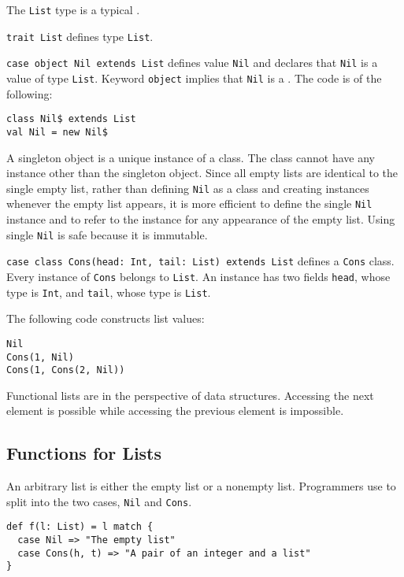 The \verb!List! type is a typical .

\verb!trait List! defines type \verb!List!.

\verb!case object Nil extends List! defines value \verb!Nil! and declares that
\verb!Nil! is a value of type \verb!List!. Keyword \verb!object! implies that
\verb!Nil! is a . The code is  of
the following:

\begin{verbatim}
class Nil$ extends List
val Nil = new Nil$
\end{verbatim}

A singleton object is a unique instance of a class. The class cannot have any
instance other than the singleton object. Since all empty lists are identical to
the single empty list, rather than defining \verb!Nil! as a class and creating
instances whenever the empty list appears, it is more efficient to define the
single \verb!Nil! instance and to refer to the instance for any appearance of the
empty list. Using single \verb!Nil! is safe because it is immutable.

\verb!case class Cons(head: Int, tail: List) extends List! defines a \verb!Cons!
class. Every instance of \verb!Cons! belongs to \verb!List!. An instance has two
fields \verb!head!, whose type is \verb!Int!, and \verb!tail!, whose type is
\verb!List!.

The following code constructs list values:

\begin{verbatim}
Nil
Cons(1, Nil)
Cons(1, Cons(2, Nil))
\end{verbatim}

Functional lists are  in the perspective of data
structures. Accessing the next element is possible while accessing the previous
element is impossible.

\subsection{Functions for Lists}

An arbitrary list is either the empty list or a nonempty list. Programmers use
 to split into the two cases, \verb!Nil! and \verb!Cons!.

\begin{verbatim}
def f(l: List) = l match {
  case Nil => "The empty list"
  case Cons(h, t) => "A pair of an integer and a list"
}
\end{verbatim}

